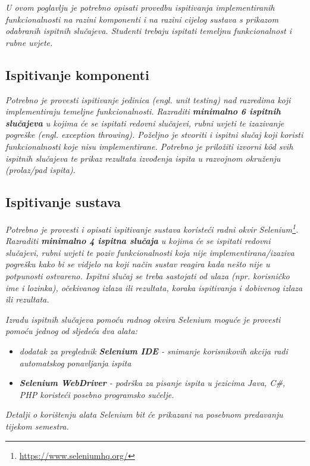 			 \textit{U ovom poglavlju je potrebno opisati provedbu ispitivanja implementiranih funkcionalnosti na razini komponenti i na razini cijelog sustava s prikazom odabranih ispitnih slučajeva. Studenti trebaju ispitati temeljnu funkcionalnost i rubne uvjete.}
	
			
			\subsection{Ispitivanje komponenti}
			\textit{Potrebno je provesti ispitivanje jedinica (engl. unit testing) nad razredima koji implementiraju temeljne funkcionalnosti. Razraditi \textbf{minimalno 6 ispitnih slučajeva} u kojima će se ispitati redovni slučajevi, rubni uvjeti te izazivanje pogreške (engl. exception throwing). Poželjno je stvoriti i ispitni slučaj koji koristi funkcionalnosti koje nisu implementirane. Potrebno je priložiti izvorni kôd svih ispitnih slučajeva te prikaz rezultata izvođenja ispita u razvojnom okruženju (prolaz/pad ispita). }
			
			
			
			\subsection{Ispitivanje sustava}
			
			 \textit{Potrebno je provesti i opisati ispitivanje sustava koristeći radni okvir Selenium\footnote{\url{https://www.seleniumhq.org/}}. Razraditi \textbf{minimalno 4 ispitna slučaja} u kojima će se ispitati redovni slučajevi, rubni uvjeti te poziv funkcionalnosti koja nije implementirana/izaziva pogrešku kako bi se vidjelo na koji način sustav reagira kada nešto nije u potpunosti ostvareno. Ispitni slučaj se treba sastojati od ulaza (npr. korisničko ime i lozinka), očekivanog izlaza ili rezultata, koraka ispitivanja i dobivenog izlaza ili rezultata.\\ }
			 
			 \textit{Izradu ispitnih slučajeva pomoću radnog okvira Selenium moguće je provesti pomoću jednog od sljedeća dva alata:}
			 \begin{itemize}
			 	\item \textit{dodatak za preglednik \textbf{Selenium IDE} - snimanje korisnikovih akcija radi automatskog ponavljanja ispita	}
			 	\item \textit{\textbf{Selenium WebDriver} - podrška za pisanje ispita u jezicima Java, C\#, PHP koristeći posebno programsko sučelje.}
			 \end{itemize}
		 	\textit{Detalji o korištenju alata Selenium bit će prikazani na posebnom predavanju tijekom semestra.}
			
